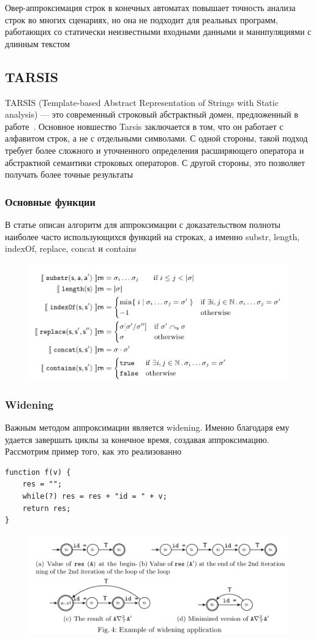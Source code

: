Овер-аппроксимация строк в конечных автоматах повышает точность анализа строк во многих сценариях, но она не подходит для реальных программ, работающих со статически неизвестными входными данными и манипуляциями с длинным текстом




\newpage
\subsection{TARSIS}

TARSIS (Template-based Abstract Representation of Strings with Static analysis) — это современный строковый абстрактный домен, предложенный в работе~\cite{tarsis2021}. Основное новшество Tarsis заключается в том, что он работает с алфавитом строк, а не с отдельными символами. С одной стороны, такой подход требует более сложного и уточненного определения расширяющего оператора и абстрактной семантики строковых операторов. С другой стороны, это позволяет получать более точные результаты

\subsubsection*{Основные функции}
В статье описан алгоритм для аппроксимации с доказательством полноты наиболее часто использующихся функций на строках, а именно substr, length, indexOf, replace, concat и contains

\begin{figure}[H]
\includegraphics[width=\textwidth]{images/tarsis-functions.png}\hfill
\end{figure}

\newpage
\subsubsection*{Widening}
Важным методом аппроксимации является widening. Именно благодаря ему удается завершать циклы за конечное время, создавая аппроксимацию. Рассмотрим пример того, как это реализованно

\begin{lstlisting}[caption={Пример применения widening}]
function f(v) {
    res = "";
    while(?) res = res + "id = " + v;
    return res;
}
\end{lstlisting}

\begin{figure}[H]
\includegraphics[width=\textwidth]{images/tarsis-widening.png}\hfill
\end{figure}